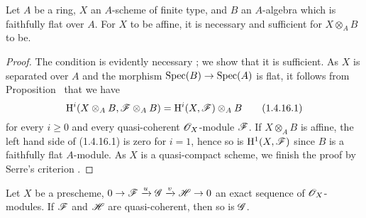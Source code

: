 \begin{corollary}[1.4.16]
\label{III.1.4.16}
Let $A$ be a ring, $X$ an $A$-scheme of finite type, and $B$ an $A$-algebra which is faithfully flat over $A$.
For $X$ to be affine, it is necessary and sufficient for $X\otimes_A B$ to be.
\end{corollary}

\begin{proof}
\label{proof-III.1.4.16}
The condition is evidently necessary ; we show that it is sufficient.
As $X$ is separated over $A$ and the morphism $\Spec(B)\to\Spec(A)$ is flat, it follows from Proposition~ that we have
\[
\label{III.1.4.16.1}
  \mathrm{H}^i(X\otimes_A B,\mathscr{F}\otimes_A B)=\mathrm{H}^i(X,\mathscr{F})\otimes_A B
  \tag{1.4.16.1}
\]
for every $i\geq 0$ and every quasi-coherent $\mathscr{O}_X$-module $\mathscr{F}$.
If $X\otimes_A B$ is affine, the left hand side of (1.4.16.1) is zero for $i=1$, hence so is $\mathrm{H}^1(X,\mathscr{F})$ since $B$ is a faithfully flat $A$-module.
As $X$ is a quasi-compact scheme, we finish the proof by Serre's criterion .
\end{proof}

\begin{proposition}[1.4.17]
\label{III.1.4.17}
Let $X$ be a prescheme, $0\to\sh{F}\xrightarrow{u}\sh{G}\xrightarrow{v}\sh{H}\to 0$ an exact sequence of $\mathscr{O}_X$-modules.
If $\mathscr{F}$ and $\mathscr{H}$ are quasi-coherent, then so is $\mathscr{G}$.
\end{proposition}

